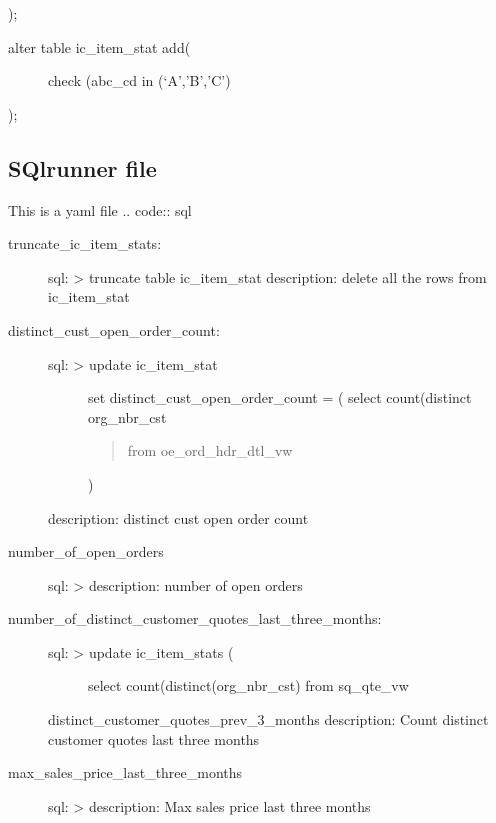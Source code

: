 \documentclass[letterpaper,10pt,english]{sphinxmanual}
\begin{document}
);
\begin{description}
\item[{alter table ic\_item\_stat add(}] \leavevmode
check (abc\_cd in (‘A’,’B’,’C’)

\end{description}

);


\subsection{SQlrunner file}
\label{\detokenize{IcItemStat:sqlrunner-file}}
This is a yaml file
.. code:: sql
\begin{description}
\item[{truncate\_ic\_item\_stats:}] \leavevmode
sql: \textgreater{} truncate table ic\_item\_stat
description: delete all the rows from ic\_item\_stat

\item[{distinct\_cust\_open\_order\_count:}] \leavevmode\begin{description}
\item[{sql: \textgreater{} update ic\_item\_stat}] \leavevmode
set distinct\_cust\_open\_order\_count =
( select count(distinct org\_nbr\_cst
\begin{quote}

from oe\_ord\_hdr\_dtl\_vw
\end{quote}

)

\end{description}

description: distinct cust open order count

\item[{number\_of\_open\_orders}] \leavevmode
sql: \textgreater{}
description: number of open orders

\item[{number\_of\_distinct\_customer\_quotes\_last\_three\_months:}] \leavevmode\begin{description}
\item[{sql: \textgreater{} update  ic\_item\_stats (}] \leavevmode
select count(distinct(org\_nbr\_cst)
from sq\_qte\_vw

\end{description}

distinct\_customer\_quotes\_prev\_3\_months
description: Count distinct customer quotes last three months

\item[{max\_sales\_price\_last\_three\_months}] \leavevmode
sql: \textgreater{}
description: Max sales price last three months


\end{description}
\end{document}
